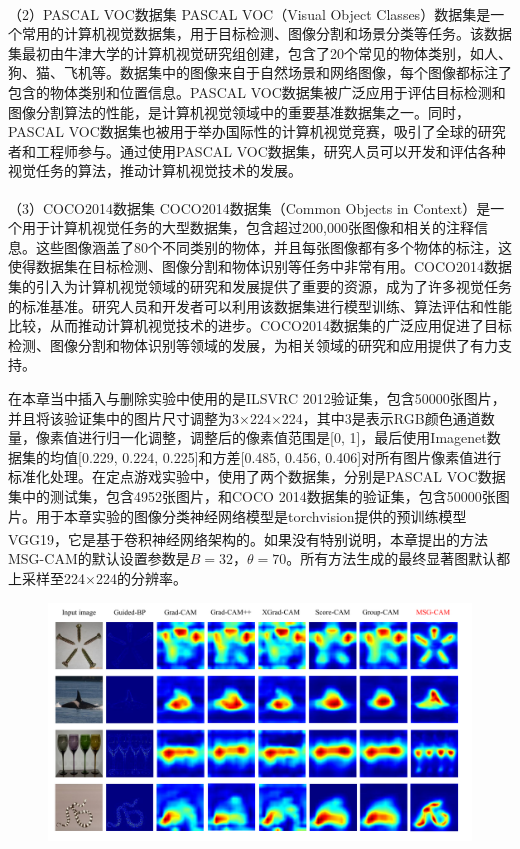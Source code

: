 （2）PASCAL VOC数据集
PASCAL VOC（Visual Object Classes）\textsuperscript{\cite{pascal}}数据集是一个常用的计算机视觉数据集，用于目标检测、图像分割和场景分类等任务。该数据集最初由牛津大学的计算机视觉研究组创建，包含了20个常见的物体类别，如人、狗、猫、飞机等。数据集中的图像来自于自然场景和网络图像，每个图像都标注了包含的物体类别和位置信息。PASCAL VOC数据集被广泛应用于评估目标检测和图像分割算法的性能，是计算机视觉领域中的重要基准数据集之一。同时，PASCAL VOC数据集也被用于举办国际性的计算机视觉竞赛，吸引了全球的研究者和工程师参与。通过使用PASCAL VOC数据集，研究人员可以开发和评估各种视觉任务的算法，推动计算机视觉技术的发展。

（3）COCO2014数据集
COCO2014数据集（Common Objects in Context）\textsuperscript{\cite{coco}}是一个用于计算机视觉任务的大型数据集，包含超过200,000张图像和相关的注释信息。这些图像涵盖了80个不同类别的物体，并且每张图像都有多个物体的标注，这使得数据集在目标检测、图像分割和物体识别等任务中非常有用。COCO2014数据集的引入为计算机视觉领域的研究和发展提供了重要的资源，成为了许多视觉任务的标准基准。研究人员和开发者可以利用该数据集进行模型训练、算法评估和性能比较，从而推动计算机视觉技术的进步。COCO2014数据集的广泛应用促进了目标检测、图像分割和物体识别等领域的发展，为相关领域的研究和应用提供了有力支持。

在本章当中插入与删除实验中使用的是ILSVRC 2012验证集，包含50000张图片，并且将该验证集中的图片尺寸调整为3$\times$224$\times$224，其中$3$是表示RGB颜色通道数量，像素值进行归一化调整，调整后的像素值范围是[0, 1]，最后使用Imagenet数据集的均值[0.229, 0.224, 0.225]和方差[0.485, 0.456, 0.406]对所有图片像素值进行标准化处理。在定点游戏实验中，使用了两个数据集，分别是PASCAL VOC数据集中的测试集，包含4952张图片，和COCO 2014数据集的验证集，包含50000张图片。用于本章实验的图像分类神经网络模型是torchvision提供的预训练模型VGG19\textsuperscript{\cite{simonyan2014very}}，它是基于卷积神经网络架构的。如果没有特别说明，本章提出的方法MSG-CAM的默认设置参数是$B=32$，$\theta=70$。所有方法生成的最终显著图默认都上采样至224$\times$224的分辨率。

\begin{figure}[!ht]
	\centering 
	\includegraphics[width=15cm]{fig/ch3/msgContrast.pdf}
	\label{fig:msgContrast}
\end{figure}

